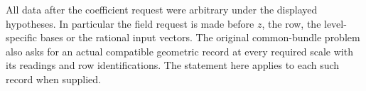 All data after the coefficient request were arbitrary under the
displayed hypotheses. In particular the field request is made
before $z$, the row, the level-specific bases or the rational
input vectors. The original common-bundle problem also asks
for an actual compatible geometric record at every required
scale with its readings and row identifications. The statement
here applies to each such record when supplied.
